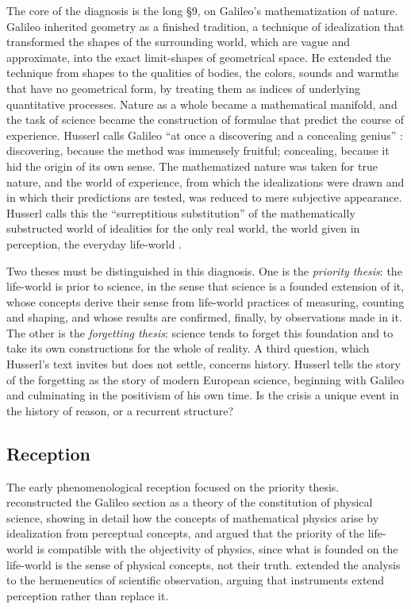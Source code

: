 \documentclass{situationist-preprint}
\begin{document}
The core of the diagnosis is the long §9, on Galileo's mathematization of nature. Galileo inherited geometry as a finished tradition, a technique of idealization that transformed the shapes of the surrounding world, which are vague and approximate, into the exact limit-shapes of geometrical space. He extended the technique from shapes to the qualities of bodies, the colors, sounds and warmths that have no geometrical form, by treating them as indices of underlying quantitative processes. Nature as a whole became a mathematical manifold, and the task of science became the construction of formulae that predict the course of experience. Husserl calls Galileo \enquote{at once a discovering and a concealing genius} \citep[§9h]{Husserl1954}: discovering, because the method was immensely fruitful; concealing, because it hid the origin of its own sense. The mathematized nature was taken for true nature, and the world of experience, from which the idealizations were drawn and in which their predictions are tested, was reduced to mere subjective appearance. Husserl calls this the \enquote{surreptitious substitution} of the mathematically substructed world of idealities for the only real world, the world given in perception, the everyday life-world \citep[§9h]{Husserl1954}.

Two theses must be distinguished in this diagnosis. One is the \emph{priority thesis}: the life-world is prior to science, in the sense that science is a founded extension of it, whose concepts derive their sense from life-world practices of measuring, counting and shaping, and whose results are confirmed, finally, by observations made in it. The other is the \emph{forgetting thesis}: science tends to forget this foundation and to take its own constructions for the whole of reality. A third question, which Husserl's text invites but does not settle, concerns history. Husserl tells the story of the forgetting as the story of modern European science, beginning with Galileo and culminating in the positivism of his own time. Is the crisis a unique event in the history of reason, or a recurrent structure?

\subsection{Reception}

The early phenomenological reception focused on the priority thesis. \citet{Gurwitsch1974} reconstructed the Galileo section as a theory of the constitution of physical science, showing in detail how the concepts of mathematical physics arise by idealization from perceptual concepts, and argued that the priority of the life-world is compatible with the objectivity of physics, since what is founded on the life-world is the sense of physical concepts, not their truth. \citet{Heelan1983} extended the analysis to the hermeneutics of scientific observation, arguing that instruments extend perception rather than replace it.
\end{document}
